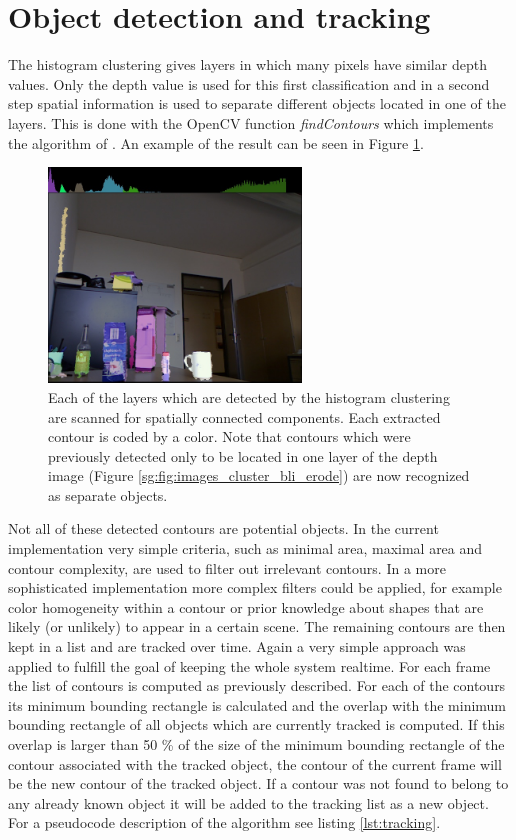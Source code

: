



\clearpage
\section{Object detection and tracking} %
\label{sg:sec:dect_track}

The histogram clustering gives layers in which many pixels have similar depth values. Only the depth value is used for this first classification and in a second step spatial information is used to separate different objects located in one of the layers. This is done with the OpenCV function \emph{findContours} which implements the algorithm of \cite{Suzuki:1985tp}. An example of the result can be seen in Figure \ref{sg:fig:images_extracted_contours}.
\begin{figure}[ht]
    \centering
        \includegraphics[width=0.6\textwidth]{images/extracted_contours.jpg}
    \caption{Each of the layers which are detected by the histogram clustering are scanned for spatially connected components. Each extracted contour is coded by a color. Note that contours which were previously detected only to be located in one layer of the depth image (Figure \ref{sg:fig:images_cluster_bli_erode}) are now recognized as separate objects.}
    \label{sg:fig:images_extracted_contours}
\end{figure}
Not all of these detected contours are potential objects. In the current implementation very simple criteria, such as minimal area, maximal area and contour complexity, are used to filter out irrelevant contours. In a more sophisticated implementation more complex filters could be applied, for example color homogeneity within a contour or prior knowledge about shapes that are likely (or unlikely) to appear in a certain scene.
The remaining contours are then kept in a list and are tracked over time. Again a very simple approach was applied to fulfill the goal of keeping the whole system realtime. For each frame the list of contours is computed as previously described. For each of the contours its minimum bounding rectangle is calculated and the overlap with the minimum bounding rectangle of all objects which are currently tracked is computed. If this overlap is larger than 50 \% of the size of the minimum bounding rectangle of the contour associated with the tracked object, the contour of the current frame will be the new contour of the tracked object. If a contour was not found to belong to any already known object it will be added to the tracking list as a new object. For a pseudocode description of the algorithm see listing \ref{lst:tracking}.
